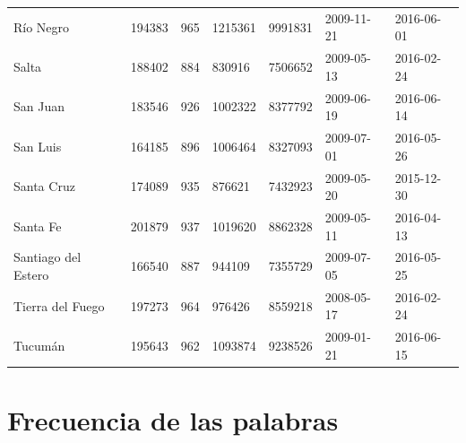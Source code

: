 \begin{table}[]
\begin{tabular}{lllllll}
Río Negro       & 194383       & 965          & 1215361    & 9991831   & 2009-11-21   & 2016-06-01   \\
Salta          & 188402       & 884          & 830916     & 7506652   & 2009-05-13   & 2016-02-24   \\
San Juan        & 183546       & 926          & 1002322    & 8377792   & 2009-06-19   & 2016-06-14   \\
San Luis        & 164185       & 896          & 1006464    & 8327093   & 2009-07-01   & 2016-05-26   \\
Santa Cruz      & 174089       & 935          & 876621     & 7432923   & 2009-05-20   & 2015-12-30   \\
Santa Fe        & 201879       & 937          & 1019620    & 8862328   & 2009-05-11   & 2016-04-13   \\
Santiago del Estero       & 166540       & 887          & 944109     & 7355729   & 2009-07-05   & 2016-05-25   \\
Tierra del Fuego & 197273       & 964          & 976426     & 8559218   & 2008-05-17   & 2016-02-24   \\
Tucumán        & 195643       & 962          & 1093874    & 9238526   & 2009-01-21   & 2016-06-15  
\end{tabular}
\end{table}



\section{Frecuencia de las palabras}


